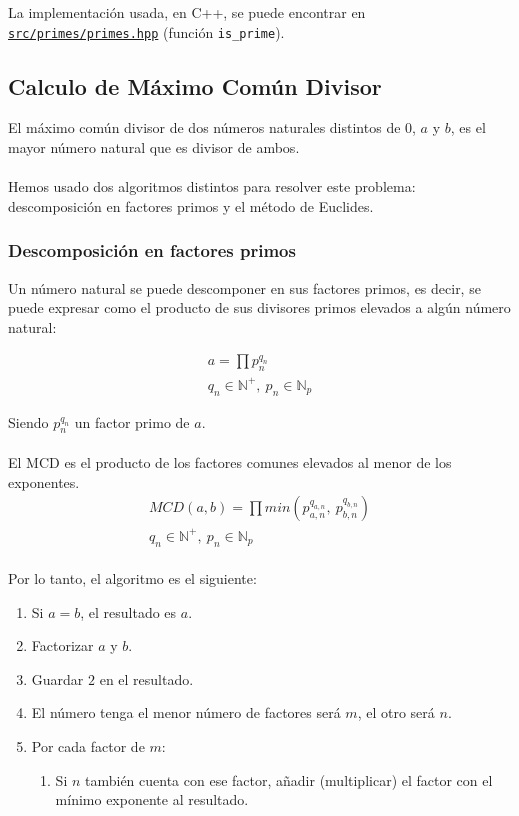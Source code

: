 La implementación usada, en C++, se puede encontrar en \href{run:./src/primes/primes.hpp}{\texttt{src/primes/primes.hpp}} (función \texttt{is\_prime}).


\subsection{Calculo de Máximo Común Divisor}

El máximo común divisor de dos números naturales distintos de $0$, $a$ y $b$, es el mayor número natural que es divisor de ambos.\\
\\
Hemos usado dos algoritmos distintos para resolver este problema: descomposición en factores primos y el método de Euclides.

\subsubsection{Descomposición en factores primos}

Un número natural se puede descomponer en sus factores primos, es decir, se puede expresar como el producto de sus divisores primos elevados a algún número natural:

\begin{gather*}
    a = \prod p_n^{q_n} \\ 
    q_n \in \mathbb{N}^+,\ p_n \in \mathbb{N}_p
\end{gather*}

Siendo $p_n^{q_n}$ un factor primo de $a$.\\
\\
El MCD es el producto de los factores comunes elevados al menor de los exponentes.
\begin{gather*}
    MCD(a, b) = \prod min(p_{a,n}^{q_{a,n}},\ p_{b,n}^{q_{b,n}}) \\ 
    q_n \in \mathbb{N}^+,\ p_n \in \mathbb{N}_p
\end{gather*}
\\
Por lo tanto, el algoritmo es el siguiente:
\begin{enumerate}
    \item Si $a=b$, el resultado es $a$.
    \item Factorizar $a$ y $b$.
    \item Guardar $2$ en el resultado.
    \item El número tenga el menor número de factores será $m$, el otro será $n$.
    \item Por cada factor de $m$:
    \begin{enumerate}
        \item Si $n$ también cuenta con ese factor, añadir (multiplicar) el factor con el mínimo exponente al resultado.
    \end{enumerate}
\end{enumerate}

